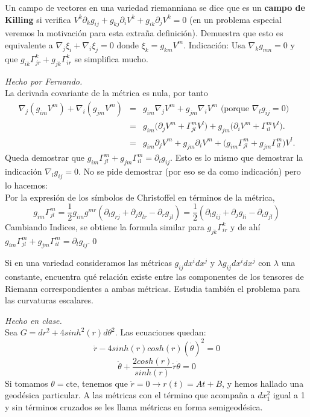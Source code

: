 \begin{problem}[10] Un campo de vectores en una variedad riemanniana se dice que es un \textbf{campo de Killing} si verifica $V^k\partial_k g_{ij}+g_{kj}\partial_i V^k+ g_{ik}\partial_jV^k=0$ (en un problema especial veremos la motivación para esta extraña definición). 
	Demuestra que esto es equivalente a  
	$\nabla_j \xi_i+\nabla_i \xi_j=0$ donde $\xi_k=g_{km}V^m$.
	Indicación:  
	Usa $\nabla_k g_{mn}=0$ y que
	$g_{ik}\Gamma_{jr}^k+g_{jk}\Gamma_{ir}^k$ se simplifica mucho. 
	
	\solution\textit{Hecho por Fernando.}\\ La derivada covariante de la métrica es nula, por tanto
	\begin{eqnarray*}
		\nabla_j(g_{im}V^m)
		+
		\nabla_i(g_{jm}V^m)
		&=&
		g_{im}\nabla_j V^m 
		+
		g_{jm}\nabla_i V^m \text{ (porque }\nabla_lg_{ij}=0 )
		\\
		&=&
		g_{im}\big( \partial_j V^m+ \Gamma_{jl}^mV^l) 
		+
		g_{jm}\big( \partial_i V^m+ \Gamma_{il}^mV^l).
		\\
		&=&
		g_{im}\partial_j V^m+g_{jm} \partial_i V^m  
		+\big( g_{im}\Gamma_{jl}^m  + g_{jm}\Gamma_{il}^m)V^l.
	\end{eqnarray*}
	Queda demostrar que $g_{im}\Gamma^m_{jl}+g_{jm}\Gamma^m_{il}=\partial_lg_{ij}$. Esto es lo mismo que demostrar la indicación $\nabla_lg_{ij}=0$. No se pide demostrar (por eso se da como indicación) pero lo hacemos:\\
	Por la expresión de los símbolos de Christoffel en términos de la métrica,
	\[
	g_{im}\Gamma_{jl}^m
	=
	\frac{1}{2}g_{im}g^{mr}
	(\partial_l g_{rj}+\partial_j g_{lr}-\partial_r g_{jl})
	=
	\frac{1}{2}
	(\partial_l g_{ij}+\partial_j g_{li}-\partial_i g_{jl})
	\]
	Cambiando Indices, se obtiene la formula similar para 
	$g_{jk}\Gamma_{ir}^k$ y de ahí $g_{im}\Gamma_{jl}^m  + g_{jm}\Gamma_{il}^m=\partial_l g_{ij}$.\qed
	
	
\end{problem}
\begin{problem}[12] Si en una variedad consideramos las métricas $g_{ij} dx^idx^j$
	y $\lambda g_{ij} dx^idx^j$ con $\lambda$ una constante, encuentra qué relación existe entre las componentes de los tensores de Riemann 
	correspondientes a ambas 
	métricas. Estudia también el problema para las curvaturas escalares. 
	
	\solution\textit{Hecho en clase.}\\ Sea $G=dr^2+4sinh^2(r)d\theta^2$. Las ecuaciones quedan:
	$$\ddot{r}-4sinh(r)cosh(r)(\dot{\theta})^2=0$$ $$\ddot{\theta}+\frac{2cosh(r)}{sinh(r)}\dot{r}\dot{\theta}=0$$
	Si tomamos $\theta=\text{cte}$, tenemos que $\ddot{r}=0\rightarrow r(t)=At+B$, y hemos hallado una geodésica particular. A las métricas con el término que acompaña a $dx^2_1$ igual a 1 y sin términos cruzados se les llama métricas en forma semigeodésica.
\end{problem}